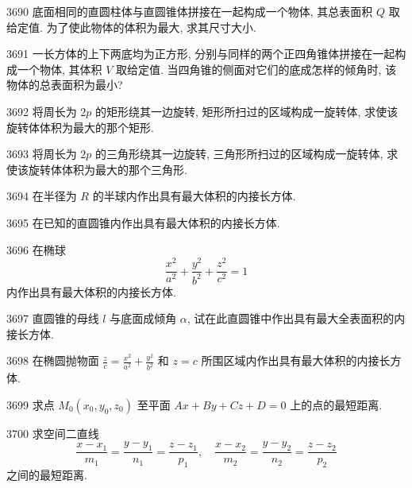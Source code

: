 \begin{prob}[M]{3690}
底面相同的直圆柱体与直圆锥体拼接在一起构成一个物体, 其总表面积 $Q$ 取给定值. 为了使此物体的体积为最大, 求其尺寸大小.
\end{prob}

\begin{prob}[M]{3691}
一长方体的上下两底均为正方形, 分别与同样的两个正四角锥体拼接在一起构成一个物体, 其体积 $V$ 取给定值. 当四角锥的侧面对它们的底成怎样的倾角时, 该物体的总表面积为最小?
\end{prob}

\begin{prob}[M]{3692}
将周长为 $2p$ 的矩形绕其一边旋转, 矩形所扫过的区域构成一旋转体, 求使该旋转体体积为最大的那个矩形.
\end{prob}

\begin{prob}[M]{3693}
将周长为 $2p$ 的三角形绕其一边旋转, 三角形所扫过的区域构成一旋转体, 求使该旋转体体积为最大的那个三角形.
\end{prob}

\begin{prob}[S]{3694}
在半径为 $R$ 的半球内作出具有最大体积的内接长方体.
\end{prob}

\begin{prob}[S]{3695}
在已知的直圆锥内作出具有最大体积的内接长方体.
\end{prob}

\begin{prob}[M]{3696}
在椭球
\[
\frac{x^2}{a^2} + \frac{y^2}{b^2} + \frac{z^2}{c^2} = 1
\]
内作出具有最大体积的内接长方体.
\end{prob}

\begin{prob}[M]{3697}
直圆锥的母线 $l$ 与底面成倾角 $\alpha$, 试在此直圆锥中作出具有最大全表面积的内接长方体.
\end{prob}

\begin{prob}[M]{3698}
在椭圆抛物面 $\frac{z}{c} = \frac{x^2}{a^2} + \frac{y^2}{b^2}$ 和 $z = c$ 所围区域内作出具有最大体积的内接长方体.
\end{prob}

\begin{prob}[S]{3699}
求点 $M_0(x_0, y_0, z_0)$ 至平面 $Ax + By + Cz + D = 0$ 上的点的最短距离.
\end{prob}

\begin{prob}[M]{3700}
求空间二直线
\[
\frac{x - x_1}{m_1} = \frac{y - y_1}{n_1} = \frac{z - z_1}{p_1}, \quad \frac{x - x_2}{m_2} = \frac{y - y_2}{n_2} = \frac{z - z_2}{p_2}
\]
之间的最短距离.
\end{prob}

